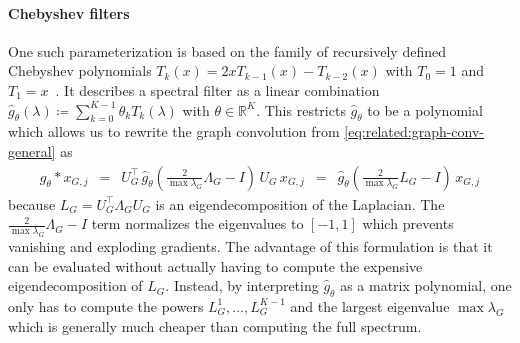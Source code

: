 \paragraph{Chebyshev filters}
One such parameterization is based on the family of recursively defined Chebyshev polynomials $T_k(x) = 2x T_{k-1}(x) - T_{k-2}(x)$ with $T_0 = 1$ and $T_1 = x$~\cite{Defferrard2016}.
It describes a spectral filter as a linear combination $\hat{g}_{\theta}(\lambda) \coloneqq \sum_{k=0}^{K-1} \theta_k T_k(\lambda)$ with $\theta \in \mathbb{R}^K$.
This restricts $\hat{g}_{\theta}$ to be a polynomial which allows us to rewrite the graph convolution from \cref{eq:related:graph-conv-general} as
\begin{align}
	g_{\theta} * x_{G,j}
	\enspace=\enspace U_G^{\top}\, \hat{g}_{\theta}(\tfrac{2}{\max{\lambda_{G}}} \Lambda_G - I)\, U_G\, x_{G,j}
	\enspace=\enspace \hat{g}_{\theta}(\tfrac{2}{\max{\lambda_{G}}} L_G - I)\, x_{G,j} \label{eq:related:graph-conv-cheby} %
\end{align}
because $L_G = U_G^{\top} \Lambda_G U_G$ is an eigendecomposition of the Laplacian.
The $\tfrac{2}{\max \lambda_{G}} \Lambda_G - I$ term normalizes the eigenvalues to $[-1, 1]$ which prevents vanishing and exploding gradients.
The advantage of this formulation is that it can be evaluated without actually having to compute the expensive eigendecomposition of $L_G$.
Instead, by interpreting $\hat{g}_{\theta}$ as a matrix polynomial, one only has to compute the powers $L_G^1, \dots, L_G^{K-1}$ and the largest eigenvalue $\max{\lambda_G}$ which is generally much cheaper than computing the full spectrum.

